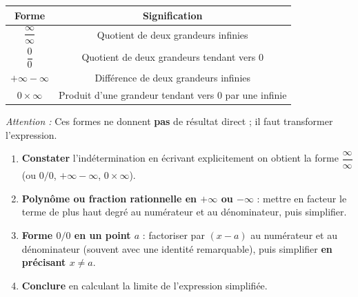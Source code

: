 \documentclass[11pt]{article}
\newcommand{\cle}[1]{{\popxbold\color{popdark}#1}}
\begin{document}
\begin{aretenir}
\begin{center}
\begin{tabular}{|c|c|}\hline
Forme & Signification \\ \hline
$\dfrac{\infty}{\infty}$ & Quotient de deux grandeurs infinies \\ \hline
$\dfrac{0}{0}$ & Quotient de deux grandeurs tendant vers $0$ \\ \hline
$+\infty-\infty$ & Différence de deux grandeurs infinies \\ \hline
$0\times\infty$ & Produit d'une grandeur tendant vers $0$ par une infinie \\ \hline
\end{tabular}
\end{center}
\emph{Attention :} Ces formes ne donnent \textbf{pas} de résultat direct ; il faut transformer l'expression.
\end{aretenir}

\begin{methode}
\begin{enumerate}
\item \textbf{Constater} l'indétermination en écrivant explicitement \og on obtient la forme $\dfrac{\infty}{\infty}$ \fg{} (ou $0/0$, $+\infty-\infty$, $0\times\infty$).
\item \textbf{Polynôme ou fraction rationnelle en $+\infty$ ou $-\infty$} : mettre en facteur le terme de \cle{plus haut degré} au numérateur et au dénominateur, puis simplifier.
\item \textbf{Forme $0/0$ en un point $a$} : factoriser par $(x-a)$ au numérateur et au dénominateur (souvent avec une identité remarquable), puis simplifier \textbf{en précisant $x\neq a$}.
\item \textbf{Conclure} en calculant la limite de l'expression simplifiée.
\end{enumerate}
\end{methode}
\end{document}
